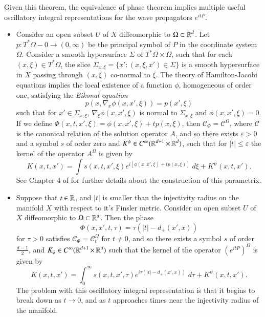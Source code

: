 Given this theorem, the equivalence of phase theorem implies multiple useful oscillatory integral representations for the wave propagators $e^{i t P}$.
\begin{itemize}
  \item Consider an open subset $U$ of $X$ diffeomorphic to $\Omega \subset \operatorname{\mathbb{R}}^d$. Let $p: T^* \Omega - 0 \to (0,\infty)$ be the principal symbol of $P$ in the coordinate system $\Omega$. Consider a smooth hypersurface $\Sigma$ of $T^* \Omega \times \Omega$, such that for each $(x,\xi) \in T^* \Omega$, the slice $\Sigma_{x,\xi} = \{ x' : (x,\xi,x') \in \Sigma \}$ is a smooth hypersurface in $X$ passing through $(x,\xi)$ co-normal to $\xi$. The theory of Hamilton-Jacobi equations implies the local existence of a function $\phi$, homogeneous of order one, satisfying the \emph{Eikonal equation}
  \begin{equation} \label{awiodjawoidhjioq23412341234234}
    p(x, \nabla_x \phi(x,x',\xi)) = p(x',\xi)
  \end{equation}
  such that for $x' \in \Sigma_{x,\xi}$, $\nabla_\xi \phi(x,x',\xi)$ is normal to $\Sigma_{x,\xi}$ and $\phi(x,x',\xi) = 0$. If we define $\Phi(x,t,x',\xi) = \phi(x,x',\xi) + t p(x,\xi)$, then $\mathcal{C}_\Phi = \mathcal{C}^{\Omega}$, where $\mathcal{C}$ is the canonical relation of the solution operator $A$, and so there exists $\varepsilon > 0$ and a symbol $s$ of order zero and $K^\psi \in C^\infty(\operatorname{\mathbb{R}}^{d+1} \times \operatorname{\mathbb{R}}^d)$, such that for $|t| \leq \varepsilon$ the kernel of the operator $A^{\Omega}$ is given by
  \begin{equation} K(x,t,x') = \int s(x,t,x',\xi) e^{i [ \phi(x,x',\xi) + t p(x,\xi) ]}\; d \xi + K^\psi(x,t,x'). \end{equation}
  See Chapter 4 of \cite{Sogge} for further details about the construction of this parametrix.

  \item Suppose that $t \in \operatorname{\mathbb{R}}$, and $|t|$ is smaller than the injectivity radius on the manifold $X$ with respect to it's Finsler metric. Consider an open subset $U$ of $X$ diffeomorphic to $\Omega \subset \operatorname{\mathbb{R}}^d$. Then the phase 
  \begin{equation} \label{onedwavephase}
    \Phi(x,x',t,\tau) = \tau ( |t| - d_+(x',x) )
  \end{equation}
  for $\tau > 0$ satisfies $\mathcal{C}_\Phi = \mathcal{C}_t^{\Omega}$ for $t \neq 0$, and so there exists a symbol $s$ of order $\tfrac{d-1}{2}$, and $K_\psi \in C^\infty(\operatorname{\mathbb{R}}^{d+1} \times \operatorname{\mathbb{R}}^d)$ such that the kernel of the operator $(e^{itP})^{\Omega}$ is given by
  \begin{equation}
    K(x,t,x') = \int_0^\infty s(x,t,x',\tau) e^{i \tau ( |t| - d_+(x',x) )}\; d\tau + K^\psi(x,t,x').
  \end{equation}
  The problem with this oscillatory integral representation is that it begins to break down as $t \to 0$, and as $t$ approaches times near the injectivity radius of the manifold.


\end{itemize}
